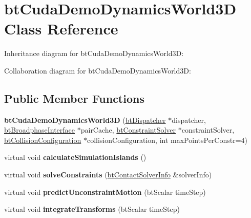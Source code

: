\hypertarget{classbt_cuda_demo_dynamics_world3_d}{\section{bt\+Cuda\+Demo\+Dynamics\+World3\+D Class Reference}
\label{classbt_cuda_demo_dynamics_world3_d}
}


Inheritance diagram for bt\+Cuda\+Demo\+Dynamics\+World3\+D\+:


Collaboration diagram for bt\+Cuda\+Demo\+Dynamics\+World3\+D\+:
\subsection*{Public Member Functions}
\begin{DoxyCompactItemize}
\item 
\hypertarget{classbt_cuda_demo_dynamics_world3_d_a2c7dce72ace97db4cf17bb87350e868d}{{\bfseries bt\+Cuda\+Demo\+Dynamics\+World3\+D} (\hyperlink{classbt_dispatcher}{bt\+Dispatcher} $\ast$dispatcher, \hyperlink{classbt_broadphase_interface}{bt\+Broadphase\+Interface} $\ast$pair\+Cache, \hyperlink{classbt_constraint_solver}{bt\+Constraint\+Solver} $\ast$constraint\+Solver, \hyperlink{classbt_collision_configuration}{bt\+Collision\+Configuration} $\ast$collision\+Configuration, int max\+Points\+Per\+Constr=4)}\label{classbt_cuda_demo_dynamics_world3_d_a2c7dce72ace97db4cf17bb87350e868d}

\item 
\hypertarget{classbt_cuda_demo_dynamics_world3_d_af563807a7e0a5e4ab8c3a5280f3631d5}{virtual void {\bfseries calculate\+Simulation\+Islands} ()}\label{classbt_cuda_demo_dynamics_world3_d_af563807a7e0a5e4ab8c3a5280f3631d5}

\item 
\hypertarget{classbt_cuda_demo_dynamics_world3_d_afed2b76e73736e48bdff7b9a25bdd832}{virtual void {\bfseries solve\+Constraints} (\hyperlink{structbt_contact_solver_info}{bt\+Contact\+Solver\+Info} \&solver\+Info)}\label{classbt_cuda_demo_dynamics_world3_d_afed2b76e73736e48bdff7b9a25bdd832}

\item 
\hypertarget{classbt_cuda_demo_dynamics_world3_d_a76a81bce95da1e8c690aa855da103e18}{virtual void {\bfseries predict\+Unconstraint\+Motion} (bt\+Scalar time\+Step)}\label{classbt_cuda_demo_dynamics_world3_d_a76a81bce95da1e8c690aa855da103e18}

\item 
\hypertarget{classbt_cuda_demo_dynamics_world3_d_a7d9e771b5eebee5479d3c65278ab703d}{virtual void {\bfseries integrate\+Transforms} (bt\+Scalar time\+Step)}\label{classbt_cuda_demo_dynamics_world3_d_a7d9e771b5eebee5479d3c65278ab703d}


\end{DoxyCompactItemize}
